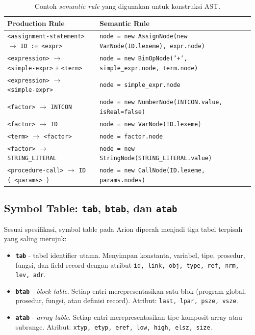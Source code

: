 \documentclass[11pt,a4paper]{article}
\begin{document}
\renewcommand{\arraystretch}{1.15}
\begin{table}[H]
\centering
\footnotesize
\begin{tabularx}{\textwidth}{l X}
\toprule
\textbf{Production Rule} & \textbf{Semantic Rule} \\
\midrule
\texttt{<assignment-statement>} $\to$ \texttt{ID := <expr>} &
    \texttt{node = new AssignNode(new VarNode(ID.lexeme), expr.node)} \\
\texttt{<expression>} $\to$ \texttt{<simple-expr>} \texttt{+} \texttt{<term>} &
    \texttt{node = new BinOpNode('+', simple\_expr.node, term.node)} \\
\texttt{<expression>} $\to$ \texttt{<simple-expr>} &
    \texttt{node = simple\_expr.node} \\
\texttt{<factor>} $\to$ \texttt{INTCON} &
    \texttt{node = new NumberNode(INTCON.value, isReal=false)} \\
\texttt{<factor>} $\to$ \texttt{ID} &
    \texttt{node = new VarNode(ID.lexeme)} \\
\texttt{<term>} $\to$ \texttt{<factor>} &
    \texttt{node = factor.node} \\
\texttt{<factor>} $\to$ \texttt{STRING\_LITERAL} &
    \texttt{node = new StringNode(STRING\_LITERAL.value)} \\
\texttt{<procedure-call>} $\to$ \texttt{ID ( <params> )} &
    \texttt{node = new CallNode(ID.lexeme, params.nodes)} \\
\bottomrule
\end{tabularx}
\caption{Contoh \textit{semantic rule} yang digunakan untuk konstruksi AST.}
\label{tab:semrules}
\end{table}
\renewcommand{\arraystretch}{1.05}

\subsection{Symbol Table: \texttt{tab}, \texttt{btab}, dan \texttt{atab}}

Sesuai spesifikasi, symbol table pada Arion dipecah menjadi tiga tabel terpisah
yang saling merujuk:

\begin{itemize}
    \item \textbf{\texttt{tab}} - tabel identifier utama. Menyimpan
          konstanta, variabel, tipe, prosedur, fungsi, dan field record dengan
          atribut \texttt{id, link, obj, type, ref, nrm, lev, adr}.
    \item \textbf{\texttt{btab}} - \textit{block table}. Setiap entri
          merepresentasikan satu blok (program global, prosedur, fungsi, atau
          definisi record). Atribut: \texttt{last, lpar, psze, vsze}.
    \item \textbf{\texttt{atab}} - \textit{array table}. Setiap entri
          merepresentasikan tipe komposit array atau subrange. Atribut:
          \texttt{xtyp, etyp, eref, low, high, elsz, size}.
\end{itemize}
\end{document}
